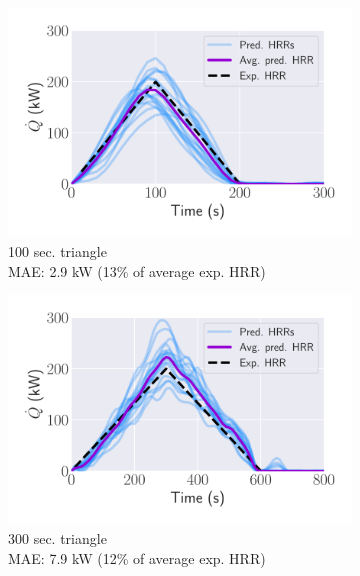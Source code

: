 \documentclass{article}
\begin{document}
\begin{figure}[htbp]
  \centering
  \begin{subfigure}[t]{.45\textwidth}
      \centering
      \includegraphics[width=\textwidth,keepaspectratio]{figures/avg_inverse_100s_triangle.pdf}
      \caption{100 sec. triangle \\ MAE: 2.9 kW (13\% of average exp. HRR)}
      \label{fig:result_100s_triangle}
  \end{subfigure}
  \begin{subfigure}[t]{.45\textwidth}
      \centering
      \includegraphics[width=\textwidth ,keepaspectratio]{figures/avg_inverse_300s_triangle.pdf}
      \caption{300 sec. triangle \\ MAE: 7.9 kW (12\% of average exp. HRR)}
      \label{fig:result_300s_triangle}
  \end{subfigure}
   \begin{subfigure}[t]{.45\textwidth}

\end{subfigure}
\end{figure}
\end{document}
